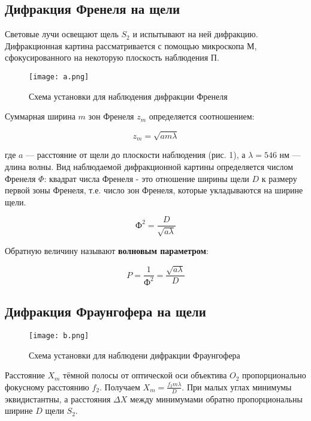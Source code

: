 \documentclass[a4paper]{article}
\begin{document}
\subsection{Дифракция Френеля на щели}
	
Световые лучи освещают щель $S_2$ и испытывают на ней дифракцию. Дифракционная картина рассматривается с помощью микроскопа М, сфокусированного на некоторую
плоскость наблюдения П.

	\begin{figure}[h!]
		\centering
		\texttt{[image: a.png]}
		\caption{Схема установки для наблюдения дифракции Френеля}
		\label{labA}
	\end{figure}

	Суммарная ширина $m$ зон Френеля $z_m$ определяется соотношением:
	
	\begin{equation}
		z_m = \sqrt{am\lambda} \label{sum}
	\end{equation}

	где $a$ — расстояние от щели до плоскости наблюдения (рис. 1), а $\lambda = 546 $ нм — длина волны. Вид
	наблюдаемой дифракционной картины определяется числом Френеля $\varPhi$: квадрат числа
	Френеля - это отношение ширины щели $D$ к размеру первой зоны Френеля, т.е. число зон
	Френеля, которые укладываются на ширине щели.

\begin{equation}\label{xin}
Ф^2 = \frac{D}{\sqrt{a\lambda}}
\end{equation}

Обратную величину называют \textbf{волновым параметром}:

\begin{equation}\label{xin}
	P = \frac{1}{Ф^2} = \frac{\sqrt{a\lambda}}{D}
\end{equation}

\subsection{Дифракция Фраунгофера на щели}


\begin{figure}[H]
	\centering
	\texttt{[image: b.png]}
	\caption{Схема установки для наблюдени дифракции Фраунгофера}
	\label{labB}
\end{figure}

Расстояние $X_m$ тёмной полосы от оптической оси объектива $O_2$ пропорционально фокусному расстоянию $f_2$.
Получаем $X_m =\frac{f_2m\lambda}{D}$. При малых углах минимумы эквидистантны, а расстояния $\varDelta X$ между минимумами обратно пропорциональны ширине $D$ щели $S_2$.
\end{document}
